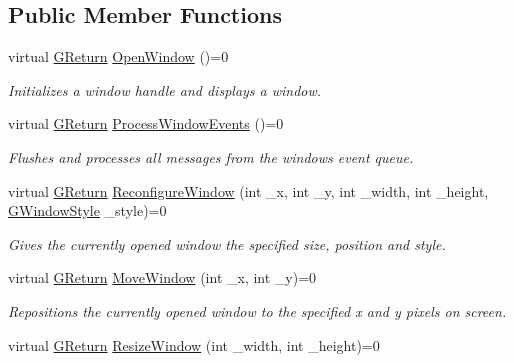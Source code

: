 \subsection*{Public Member Functions}
\begin{DoxyCompactItemize}
\item 
virtual \mbox{\hyperlink{namespaceGW_a67a839e3df7ea8a5c5686613a7a3de21}{G\+Return}} \mbox{\hyperlink{classGW_1_1SYSTEM_1_1GWindow_a402b550212d77f19638ef1a1db9ad397}{Open\+Window}} ()=0
\begin{DoxyCompactList}\small\item\em Initializes a window handle and displays a window. \end{DoxyCompactList}\item 
virtual \mbox{\hyperlink{namespaceGW_a67a839e3df7ea8a5c5686613a7a3de21}{G\+Return}} \mbox{\hyperlink{classGW_1_1SYSTEM_1_1GWindow_a6c7db60db04436ac21cba3147f287e84}{Process\+Window\+Events}} ()=0
\begin{DoxyCompactList}\small\item\em Flushes and processes all messages from the window\textquotesingle{}s event queue. \end{DoxyCompactList}\item 
virtual \mbox{\hyperlink{namespaceGW_a67a839e3df7ea8a5c5686613a7a3de21}{G\+Return}} \mbox{\hyperlink{classGW_1_1SYSTEM_1_1GWindow_a113350a164370d30932a0476f00e4ea9}{Reconfigure\+Window}} (int \+\_\+x, int \+\_\+y, int \+\_\+width, int \+\_\+height, \mbox{\hyperlink{namespaceGW_1_1SYSTEM_ad117891e556631f842625c348d36a071}{G\+Window\+Style}} \+\_\+style)=0
\begin{DoxyCompactList}\small\item\em Gives the currently opened window the specified size, position and style. \end{DoxyCompactList}\item 
virtual \mbox{\hyperlink{namespaceGW_a67a839e3df7ea8a5c5686613a7a3de21}{G\+Return}} \mbox{\hyperlink{classGW_1_1SYSTEM_1_1GWindow_a9fc043b893f26c35e6ba965adcc17edb}{Move\+Window}} (int \+\_\+x, int \+\_\+y)=0
\begin{DoxyCompactList}\small\item\em Repositions the currently opened window to the specified x and y pixels on screen. \end{DoxyCompactList}\item 
virtual \mbox{\hyperlink{namespaceGW_a67a839e3df7ea8a5c5686613a7a3de21}{G\+Return}} \mbox{\hyperlink{classGW_1_1SYSTEM_1_1GWindow_a92633707248f32e4c166f27f03690d6d}{Resize\+Window}} (int \+\_\+width, int \+\_\+height)=0

\end{DoxyCompactItemize}

